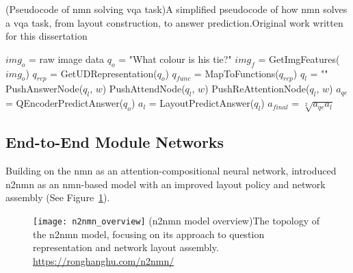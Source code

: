 \begin{algorithm}
\captionsource(Pseudocode of \acrshort{nmn} solving \acrshort{vqa} task){A simplified pseudocode of how \acrshort{nmn} solves a \acrshort{vqa} task, from layout construction, to answer prediction.}{Original work written for this dissertation}\label{alg:nmn_solving_pseudocode}
\begin{algorithmic}[1]
    \State $img_o$ = raw image data 
    \State $q_o$ = "What colour is his tie?" 
    \State $img_f$ = GetImgFeatures($img_o$) 
    \State $q_{rep}$ = GetUDRepresentation($q_o$) 
    \State $q_{func}$ = MapToFunctions($q_{rep}$) 
    \State $q_l$ = "" 
     
            \State PushAnswerNode($q_l$, $w$) 
            \State PushAttendNode($q_l$, $w$) 
        \Else
            \State PushReAttentionNode($q_l$, $w$) 
        \EndIf
    \EndFor
    \State {}
    \State $a_{qe}$ = QEncoderPredictAnswer($q_o$) 
    \State $a_l$ = LayoutPredictAnswer($q_l$) 
    \State {}
    \State $a_{final}$ = $\sqrt[{2}]{a_{qe}a_{l}}$ 
\end{algorithmic}
\end{algorithm}

\clearpage
\subsection{End-to-End Module Networks}
\label{subsec:n2nmn}

Building on the \acrshort{nmn} as an attention-compositional neural network, \citeauthor{hu_learning_2017} introduced \acrfull{n2nmn} as an \acrshort{nmn}-based model with an improved layout policy and network assembly \cite{hu_learning_2017} (See Figure~\ref{fig:n2nmn_overview}).

\begin{figure}[htbp]
    \centering
    \texttt{[image: n2nmn\_overview]}
    \captionsource(\acrshort{n2nmn} model overview){The topology of the \acrshort{n2nmn} model, focusing on its approach to question representation and network layout assembly. \label{fig:n2nmn_overview}}{\url{https://ronghanghu.com/n2nmn/}}
\end{figure}

